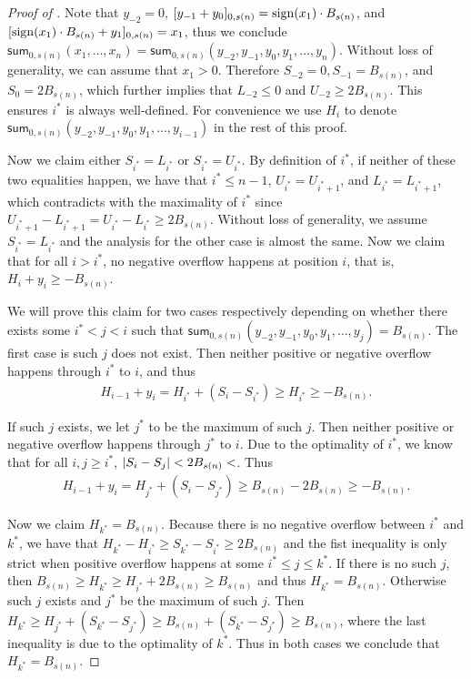 \begin{proof}[Proof of ]
Note that $y_{-2}=0$, $[y_{-1}+y_0]_{0,s(n)} = \operatorname*{sign}(x_1) \cdot B_{s(n)}$, and $[\operatorname*{sign}(x_1) \cdot B_{s(n)} + y_1]_{0,s(n)} = x_1$, thus we conclude $\mathsf{sum}_{0,s(n)}(x_1,\ldots,x_n) = \mathsf{sum}_{0,s(n)}(y_{-2},y_{-1},y_0,y_1,\ldots,y_n)$. 
Without loss of generality, we can assume that $x_1>0$. Therefore $S_{-2} = 0, S_{-1} = B_{s(n)}$, and $S_{0} = 2B_{s(n)}$, which further implies that $L_{-2}\le 0$ and $U_{-2}\ge 2 B_{s(n)}$. This ensures $i^*$ is always well-defined. For convenience we use $H_i$ to denote $\mathsf{sum}_{0,s(n)}(y_{-2},y_{-1},y_0,y_1,\ldots,y_{i-1})$ in the rest of this proof.

Now we claim either $S_{i^*} = L_{i^*}$ or $S_{i^*} = U_{i^*}$. By definition of $i^*$, if neither of these two equalities happen, we have that $i^*\le n-1$, $U_{i^*}= U_{i^*+1}$, and $L_{i^*}= L_{i^*+1}$, which contradicts with the maximality of $i^*$ since $U_{i^*+1} - L_{i^*+1} = U_{i^*} - L_{i^*}\ge 2B_{s(n)}$. Without loss of generality, we assume $S_{i^*} = L_{i^*}$ and the analysis for the other case  is almost the same. Now we claim that for all $i>i^*$, no negative overflow happens at position $i$, that is, $H_i+ y_i\ge -B_{s(n)}$.

We will prove this claim for two cases respectively depending on whether there exists some $i^*<j<i$ such that $\mathsf{sum}_{0,s(n)}(y_{-2},y_{-1},y_0,y_1,\ldots,y_{j}) = B_{s(n)}$.  The first case is such $j$ does not exist. Then neither positive or negative overflow happens through $i^*$ to $i$, and thus 
\begin{align}
H_{i-1} + y_i 
= H_{i^*} + (S_i-S_{i^*})
\ge  H_{i^*} 
\ge -B_{s(n)}.
\end{align}

If such $j$ exists, we let $j^*$ to be the maximum of such $j$. Then neither positive or negative overflow happens through $j^*$ to $i$. Due to the optimality of $i^*$, we know that for all $i,j\ge i^*$, $ \left| S_{i}-S_{j} \right|<   2B_{s(n)}<$. Thus
\begin{align}
H_{i-1} + y_i 
= H_{j^*} + (S_i-S_{j^*})
\ge  B_{s(n)} - 2B_{s(n)} 
\ge -B_{s(n)}.
\end{align} 

Now we claim $H_{k^*} = B_{s(n)}$. Because there is no negative overflow between $i^*$ and $k^*$, we have that $H_{k^*}- H_{i^*} \ge S_{k^*}-S_{i^*}\ge 2B_{s(n)}$ and the fist inequality is only strict when positive overflow happens at some $i^*\le j\le k^*$. If there is no such $j$, then $B_{s(n)}\ge H_{k^*}\ge H_{i^*}+2B_{s(n)}\ge B_{s(n)}$ and thus $H_{k^*} = B_{s(n)}$. Otherwise such $j$ exists and $j^*$ be the maximum of such $j$. Then $H_{k^*}\ge  H_{j^*} + (S_{k^*}-S_{j^*}) \ge B_{s(n)} + (S_{k^*}-S_{j^*})\ge B_{s(n)}$, where the last inequality is due to the optimality of $k^*$. Thus in both cases we conclude that $H_{k^*} = B_{s(n)}$. 


\end{proof}
